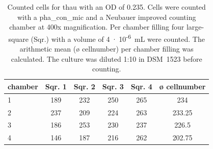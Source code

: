 \begin{table}[ht]
\centering
\caption[Counted cells for \acrlong{thau} with an \acrshort{OD} of 0.235.]{Counted cells for \acrlong{thau} with an \acrshort{OD} of 0.235. Cells were counted with a \gls{pha_con_mic} and a Neubauer improved counting chamber at 400x magnification. Per chamber filling four large-square (Sqr.) with a volume of 4~$\cdot$~10\textsuperscript{-6}~mL were counted. The arithmetic mean (ø cellnumber) per chamber filling was calculated. The culture was diluted 1:10 in DSM~1523 before counting.} 
\label{tab:cellnmr_thau_X}
\begin{tabular}{lccccc}
  \toprule
chamber & Sqr. 1 & Sqr. 2 & Sqr. 3 & Sqr. 4 & ø cellnumber \\ 
  \midrule
1 & 189 & 232 & 250 & 265 & 234 \\ 
  2 & 237 & 209 & 224 & 263 & 233.25 \\ 
  3 & 186 & 253 & 230 & 237 & 226.5 \\ 
  4 & 146 & 187 & 216 & 262 & 202.75 \\ 
   \bottomrule
\end{tabular}
\end{table}
